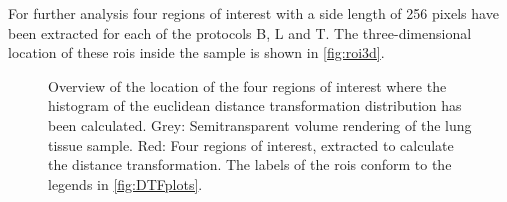 For further analysis four regions of interest with a side length of 256 pixels have been extracted for each of the protocols B, L and T. The three-dimensional location of these \acp{roi} inside the sample is shown in \autoref{fig:roi3d}.

\renewcommand{\imsize}{1.41\linewidth}%
\pgfmathsetlength{\imagewidth}{\linewidth}%
%
\begin{figure}[htb]%
	\noindent{}%
	\caption[Location of the four \acsp{roi} in the sample]{Overview of the location of the four regions of interest where the histogram of the euclidean distance transformation distribution has been calculated. Grey: Semitransparent volume rendering of the lung tissue sample. Red: Four regions of interest, extracted to calculate the distance transformation. The labels of the \acp{roi} conform to the legends in \autoref{fig:DTFplots}.}%
	\label{fig:roi3d}
\end{figure}%

